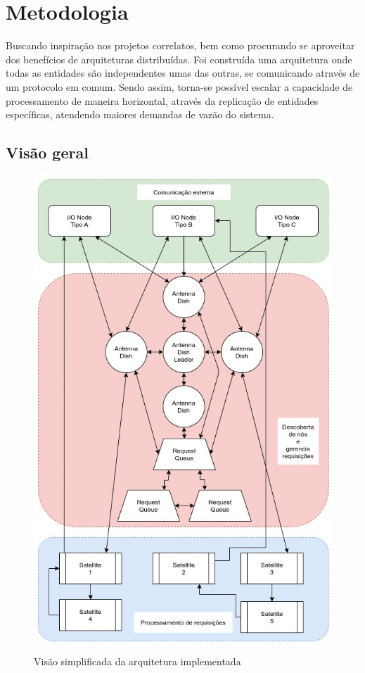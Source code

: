 \chapter{Metodologia}

    Buscando inspiração nos projetos correlatos, bem como procurando se aproveitar dos benefícios de arquiteturas distribuídas. Foi construída uma arquitetura onde todas as entidades são independentes umas das outras, se comunicando através de um protocolo em comum. Sendo assim, torna-se possível escalar a capacidade de processamento de maneira horizontal, através da replicação de entidades específicas, atendendo maiores demandas de vazão do sistema. 

\section{Visão geral}

    \begin{figure}[!ht]
    	\centering
    	\caption{Visão simplificada da arquitetura implementada}
    
    	\includegraphics[width=12.5cm]{figuras/metodologia/antenna_simplified_diagram.jpg}
    	\label{fig:antenna_simplified_diagram}
    \end{figure}

